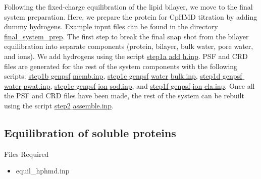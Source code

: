 Following the fixed-charge equilibration of the lipid bilayer,
we move to the final system preparation.
Here, we prepare the protein for CpHMD titration by adding dummy hydrogens.
Example input files can be found in the directory \href{https://gitlab.com/shenlab-amber-cphmd/cphmd-tutorial/-/tree/main/memb_hphmd_charmm/final_system_prep}{final\_system\_prep}. 
The first step to break the final snap shot from the bilayer equilibration into separate components (protein, bilayer, bulk water, pore water, and ions).
We add hydrogens using the script
\href{https://gitlab.com/shenlab-amber-cphmd/cphmd-tutorial/-/tree/main/memb_hphmd_charmm/final_system_prep/step1a_add_h.inp}{step1a$\_$add$\_$h.inp}.
PSF and CRD files are generated for the rest of the system components 
with the following scripts:
\href{https://gitlab.com/shenlab-amber-cphmd/cphmd-tutorial/-/tree/main/memb_hphmd_charmm/final_system_prep/step1b_genpsf_memb.inp}{step1b$\_$genpsf$\_$memb.inp}, 
\href{https://gitlab.com/shenlab-amber-cphmd/cphmd-tutorial/-/tree/main/memb_hphmd_charmm/final_system_prep/step1c_genpsf_water_bulk.inp}{step1c$\_$genpsf$\_$water$\_$bulk.inp}, 
\href{https://gitlab.com/shenlab-amber-cphmd/cphmd-tutorial/-/tree/main/memb_hphmd_charmm/final_system_prep/step1d_genpsf_water_pwat.inp}{step1d$\_$genpsf$\_$water$\_$pwat.inp},
\href{https://gitlab.com/shenlab-amber-cphmd/cphmd-tutorial/-/tree/main/memb_hphmd_charmm/final_system_prep/step1e_genpsf_ion_sod.inp}{step1e$\_$genpsf$\_$ion$\_$sod.inp}, and
\href{https://gitlab.com/shenlab-amber-cphmd/cphmd-tutorial/-/tree/main/memb_hphmd_charmm/final_system_prep/step1f_genpsf_ion_cla.inp}{step1f$\_$genpsf$\_$ion$\_$cla.inp}.
Once all the PSF and CRD files have been made,
the rest of the system can be rebuilt using the script 
\href{https://gitlab.com/shenlab-amber-cphmd/cphmd-tutorial/-/tree/main/memb_hphmd_charmm/final_system_prep/step2_assemble.inp}{step2$\_$assemble.inp}.


\subsection{Equilibration of soluble proteins}

\begin{checklist}{Files Required}
\begin{itemize}
\item equil\_hphmd.inp
\end{itemize}
\end{checklist}

